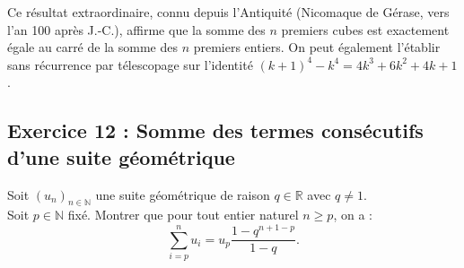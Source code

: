 \documentclass[11pt,a4paper]{article}
\newcommand{\N}{\mathbb{N}}
\newcommand{\R}{\mathbb{R}}
\begin{document}
\begin{remarquabox}
Ce résultat extraordinaire, connu depuis l'Antiquité (Nicomaque de Gérase, vers l'an 100 après J.-C.), affirme que la somme des $n$ premiers cubes est exactement égale au carré de la somme des $n$ premiers entiers.
On peut également l'établir sans récurrence par télescopage sur l'identité $(k+1)^4 - k^4 = 4k^3 + 6k^2 + 4k + 1$.
\end{remarquabox}

\subsection*{Exercice 12 : Somme des termes consécutifs d'une suite géométrique}

Soit $(u_n)_{n \in \N}$ une suite géométrique de raison $q \in \R$ avec $q \neq 1$.\\
Soit $p \in \N$ fixé. Montrer que pour tout entier naturel $n \ge p$, on a :
\[
\sum_{i=p}^n u_i = u_p \frac{1 - q^{n+1-p}}{1 - q}.
\]
\end{document}
